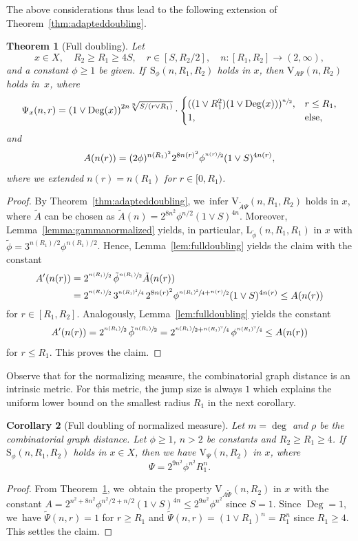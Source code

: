 \documentclass[JEP,XML,SOM,Unicode,published]{cedram}
\newcommand{\rS}{\mathrm{S}}
\newcommand{\rV}{\mathrm{V}}
\newcommand{\rL}{\mathrm{L}}
\theoremstyle{plain}
\newtheorem{theorem}{Theorem}[section]
\newtheorem{corollary}[theorem]{Corollary}
\theoremstyle{definition}
\DeclareMathOperator{\Deg}{Deg}
\begin{document}
The above considerations thus lead to the following extension of Theorem~\ref{thm:adapteddoubling}.
\begin{theorem}[Full doubling]\label{thm:fulldoubling}
Let
\[
x\in X,\quad R_2\geq R_1\geq 4S,\quad r\in[S,R_2/2],\quad n:[R_{1},R_{2}]\to (2,\infty),
\]
and a constant $\phi\geq1$ be given. If~$\rS_\phi(n,R_1,R_2)$ holds in $x$, then $\rV_{\!A\Psi}(n,R_2) $ holds in~$x$, where
\[
\Psi_x(n,r)
=\left(1\vee\Deg(x)\right)^{{2}n\sqrt[n]{S/(r\vee R_1)}}
\cdot\begin{cases}
((1\vee R_1^{2})(1\vee\Deg(x)))^{\sfrac{n}{2}},& r\leq R_1,
\\
1,& \text{else,}
\end{cases}
\]
and
\[
A(n(r))=(2\phi)^{{n(R_1)^2} }2^{8n(r)^2}\phi^{\sfrac{n(r)}2}(1\vee S)^{4n(r)},
\]
where we extended $ n(r)=n(R_{1}) $ for $ r\in [0,R_{1}) $.
\end{theorem}
\begin{proof}
By Theorem~\ref{thm:adapteddoubling}, we~infer {$\rV_{\!\tilde A\Psi}(n,R_1,R_2) $ holds in $x$, where $\tilde A$ can be chosen as $\tilde A(n)=2^{{8}n^2}\phi^{n{/2}}(1\vee S)^{{4}n}$}. Moreover, Lemma~\ref{lemma:gammanormalized} yields, in particular, $\rL_{\tilde \phi}(n,R_1,R_1)$ in $x$ with $\tilde\phi={3}^{n(R_{1})/2}\phi^{n(R_{1})/2}$. Hence, Lemma~\ref{lem:fulldoubling} yields the claim with the constant
\begin{align*}
A'(n(r))&=2^{\sfrac{n(R_{1})}{2}}\,\tilde\phi^{\sfrac{n(R_{1})}{2}}\tilde A(n(r))\\
&=2^{\sfrac{n(R_1)}{2}}\,3^{\sfrac{n(R_1)^2}{4}}\,2^{8n(r)^2}\phi^{\sfrac{n(R_1)^2}{4}+\sfrac{n(r)}{2}}(1\vee S)^{{4}n(r)}\leq A(n(r))
\end{align*}
for $r\in[R_1,R_2]$. Analogously,
Lemma~\ref{lem:fulldoubling} yields the constant
\[
A'(n(r)) = 2^{\sfrac{n(R_{1})}{2}}\,\tilde\phi^{\sfrac{n(R_{1})}{2}}= 2^{\sfrac{n(R_1)}{2}+\sfrac{n(R_1)^2}{4}}\, \phi^{\sfrac{n(R_1)^2}{4}}\leq A(n(r))
\]
for $ r\leq R_{1} $. This proves the claim.
\end{proof}

Observe that for the normalizing measure, the combinatorial graph distance is an intrinsic metric. For this metric, the jump size is always $ 1 $ which explains the uniform lower bound on the smallest radius $ R_{1} $ in the next corollary.

\begin{corollary}[Full doubling of normalized measure]\label{cor:adapteddoubling} Let $m=\deg$ and $ \rho $ be the combinatorial graph distance. Let $\phi\geq 1$, $ n>2 $ be constants and $R_2\geq R_1\geq 4$. If~$\rS_{\phi}(n, R_1,R_2)$ holds in $x\in X$, then we have $\rV_{{\Psi}}(n, R_2)$ in $x$,
where
\[
\Psi = 2^{9n^2}\phi^{n^2} R_1^n.
\]
\end{corollary}
\begin{proof}
From Theorem~\ref{thm:fulldoubling}, we~obtain the property $\rV_{\!A{\tilde \Psi}}(n,R_{2}) $ in $x$ with the constant $ A=2^{{n^2}+8n^2}\phi^{n^2/2+n/2}(1\vee S)^{4n}\leq 2^{9n^2}\phi^{n^2} $ since $ S=1 $.
Since $ \Deg =1 $, we~have $ \tilde \Psi(n,r)=1 $ for $ r\ge R_1 $ and $ \tilde\Psi(n,r) =(1\vee R_{1})^{n}=R_{1}^{n}$ since $ R_{1}\ge 4 $. This settles the claim.
\end{proof}
\end{document}
